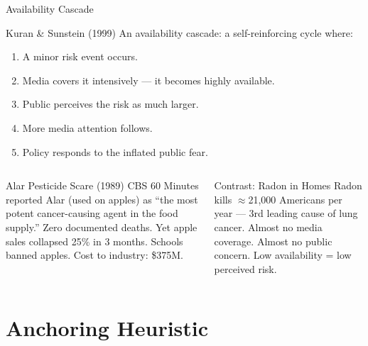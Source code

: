 \documentclass[aspectratio=169]{beamer}
\begin{document}
\begin{frame}{Availability Cascade}
\begin{block}{Kuran \& Sunstein (1999)}
An \alert{availability cascade}: a self-reinforcing cycle where:
\begin{enumerate}
  \item A minor risk event occurs.
  \item Media covers it intensively --- it becomes highly available.
  \item Public perceives the risk as much larger.
  \item More media attention follows.
  \item Policy responds to the inflated public fear.
\end{enumerate}
\end{block}
\begin{columns}
\begin{exampleblock}{Alar Pesticide Scare (1989)}
CBS 60 Minutes reported Alar (used on apples) as ``the most potent cancer-causing agent in the food supply.'' Zero documented deaths. Yet apple sales collapsed 25\% in 3 months. Schools banned apples. Cost to industry: \$375M.
\end{exampleblock}
\begin{alertblock}{Contrast: Radon in Homes}
Radon kills $\approx$21,000 Americans per year --- 3rd leading cause of lung cancer. Almost no media coverage. Almost no public concern. Low availability = low perceived risk.
\end{alertblock}
\end{columns}
\end{frame}

\section{Anchoring Heuristic}
\end{document}
